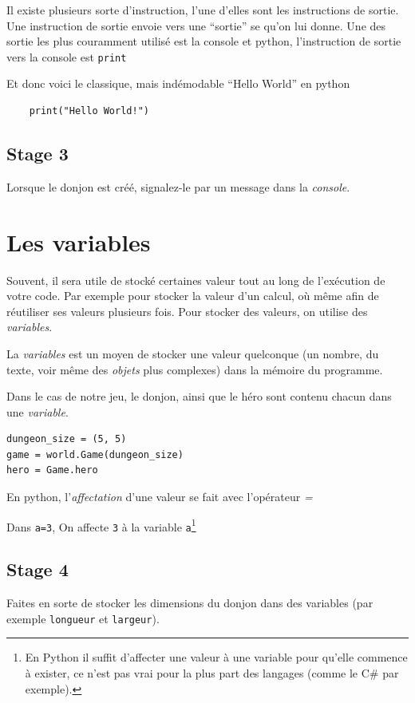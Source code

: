 \documentclass[12pt,a4paper]{report}
\newcommand{\codeintext}[1]{\texttt{#1}}
\begin{document}
Il existe plusieurs sorte d’instruction, l’une d’elles sont les instructions de sortie.
Une instruction de sortie envoie vers une “sortie” se qu’on lui donne.
Une des sortie les plus couramment utilisé est la console et python, l’instruction de sortie vers la console est \codeintext{print}

Et donc voici le classique, mais indémodable “Hello World” en python

\begin{lstlisting}
    print("Hello World!")
\end{lstlisting}


\subsection{Stage 3}
Lorsque le donjon est créé, signalez-le par un message dans la \emph{console}.

\section{Les variables}

Souvent, il sera utile de stocké certaines valeur tout au long de l’exécution de votre code.
Par exemple pour stocker la valeur d’un calcul, où même afin de réutiliser ses valeurs plusieurs fois. Pour stocker des valeurs, on utilise des \emph{variables}.

La \emph{variables} est un moyen de stocker une valeur quelconque (un nombre, du texte, voir même des \emph{objets} plus complexes) dans la mémoire du programme.

Dans le cas de notre jeu, le donjon, ainsi que le héro sont contenu chacun dans une \emph{variable}.

\begin{lstlisting}
dungeon_size = (5, 5)
game = world.Game(dungeon_size)
hero = Game.hero
\end{lstlisting}

En python, l’\emph{affectation} d’une valeur se fait avec l’opérateur \emph{=}

Dans \codeintext{a=3}, On affecte \codeintext{3} à la variable \codeintext{a}\footnote{ En Python il suffit d’affecter une valeur à une variable pour qu’elle commence à exister, ce n’est pas vrai pour la plus part des langages (comme le C\# par exemple).}

\subsection{Stage 4}
Faites en sorte de stocker les dimensions du donjon dans des variables (par exemple \codeintext{longueur} et \codeintext{largeur}).
\end{document}
